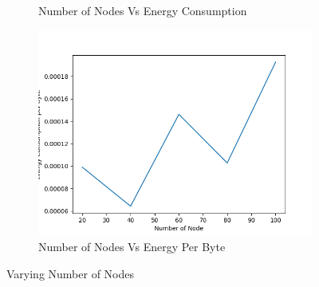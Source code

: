 \begin{figure}[h]
\begin{subfigure}{.5\textwidth}
     \caption{Number of Nodes Vs Energy Consumption}
     \label{node_energy}
\end{subfigure}
\begin{subfigure}{.5\textwidth}
  \centering
  \includegraphics[width=.8\linewidth]{_15_4_static/NumberofNodevsEnergyConsumptionperByte.png}
     \caption{Number of Nodes Vs Energy Per Byte}
     \label{node_energy_per_byte}
\end{subfigure}
\caption{Varying Number of Nodes}
\label{fig:varyingNode}
\end{figure}
